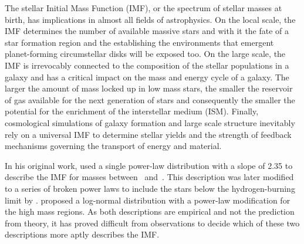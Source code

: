 The stellar Initial Mass Function (IMF), or the spectrum of stellar masses at birth,  has implications in almost all fields of astrophysics.  
On the local scale, the IMF determines the number of available massive stars and with it the fate of a star formation region and the establishing the environments that emergent planet-forming circumstellar disks will be exposed too. 
On the large scale, the IMF is irrevocably connected to the composition of the stellar populations in a galaxy and has a critical impact on the mass and energy cycle of a galaxy. 
The larger the amount of mass locked up in low mass stars, the smaller the reservoir of gas available for the next generation of stars and consequently the smaller the potential for the enrichment of the interstellar medium (ISM). 
Finally, cosmological simulations of galaxy formation and large scale structure inevitably rely on a universal IMF to determine stellar yields and the strength of feedback mechanisms governing the transport of energy and material. %


In his original work, \citet{salpeter1955} used a single power-law distribution with a slope of 2.35 to describe the IMF for masses between \ and \,\msun . This description was later modified to a series of broken power laws to include the stars below the hydrogen-burning limit by \citet{kroupa2001}. \citet{chabrier2005} proposed a log-normal distribution with a power-law modification for the high mass regions. As both descriptions are empirical and not the prediction from theory, it has proved difficult from observations to decide which of these two descriptions more aptly describes the IMF.

